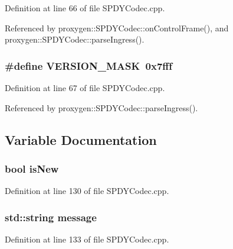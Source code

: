 Definition at line 66 of file S\+P\+D\+Y\+Codec.\+cpp.



Referenced by proxygen\+::\+S\+P\+D\+Y\+Codec\+::on\+Control\+Frame(), and proxygen\+::\+S\+P\+D\+Y\+Codec\+::parse\+Ingress().

\subsubsection[{V\+E\+R\+S\+I\+O\+N\+\_\+\+M\+A\+SK}]{\setlength{\rightskip}{0pt plus 5cm}\#define V\+E\+R\+S\+I\+O\+N\+\_\+\+M\+A\+SK~0x7fff}\label{SPDYCodec_8cpp_a0d391204b13eedba9566bf69943fdf9e}


Definition at line 67 of file S\+P\+D\+Y\+Codec.\+cpp.



Referenced by proxygen\+::\+S\+P\+D\+Y\+Codec\+::parse\+Ingress().



\subsection{Variable Documentation}
\subsubsection[{is\+New}]{\setlength{\rightskip}{0pt plus 5cm}bool is\+New}\label{SPDYCodec_8cpp_a9530e1e393763277fa4e373d996a2142}


Definition at line 130 of file S\+P\+D\+Y\+Codec.\+cpp.

\subsubsection[{message}]{\setlength{\rightskip}{0pt plus 5cm}std\+::string {\bf message}}\label{SPDYCodec_8cpp_a36bd74109f547f7f8198faf5a12d2879}


Definition at line 133 of file S\+P\+D\+Y\+Codec.\+cpp.


